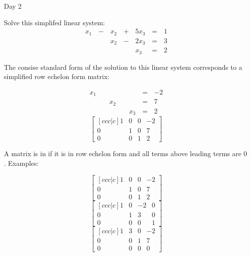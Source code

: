 \begin{applicationActivities}{Day 2}
\begin{activity}{10}
  Solve this simplifed linear system:
    \begin{alignat*}{4}
       x_1 &\,-\,&  x_2  &\,+\,&  5x_3 &\,=\,& 1 \\
           &\, \,&  x_2 &\,-\,&  2x_3 &\,=\,& 3 \\
           &\, \,&      &\, \,&   x_3 &\,=\,& 2
    \end{alignat*}
\end{activity}

\begin{observation}
  The consise standard form of the solution to this linear system
  corresponds to a simplified row echelon form matrix:
  \begin{multicols}{2}\noindent
    \begin{alignat*}{4}
       x_1 &\, \,&      &\, \,&       &\,=\,& -2 \\
           &\, \,&  x_2 &\, \,&       &\,=\,& 7 \\
           &\, \,&      &\, \,&   x_3 &\,=\,& 2
    \end{alignat*}
    \[
      \begin{bmatrix}[ccc|c]
        1 & 0 & 0 & -2 \\
        0 & 1 & 0 & 7 \\
        0 & 0 & 1 & 2
      \end{bmatrix}
    \]
  \end{multicols}
\end{observation}

\begin{definition}
  A matrix is in  if it is in row echelon form
  and all terms above leading terms are \(0\). Examples:
  \begin{multicols}{3}\noindent
    \[
      \begin{bmatrix}[ccc|c]
        1 & 0 & 0 & -2 \\
        0 & 1 & 0 & 7 \\
        0 & 0 & 1 & 2
      \end{bmatrix}
    \]
    \[
      \begin{bmatrix}[ccc|c]
        1 & 0 & -2 & 0 \\
        0 & 1 & 3 & 0 \\
        0 & 0 & 0 & 1
      \end{bmatrix}
    \]
    \[
      \begin{bmatrix}[ccc|c]
        1 & 3 & 0 & -2 \\
        0 & 0 & 1 & 7 \\
        0 & 0 & 0 & 0
      \end{bmatrix}
    \]
  \end{multicols}
\end{definition}


\end{applicationActivities}
